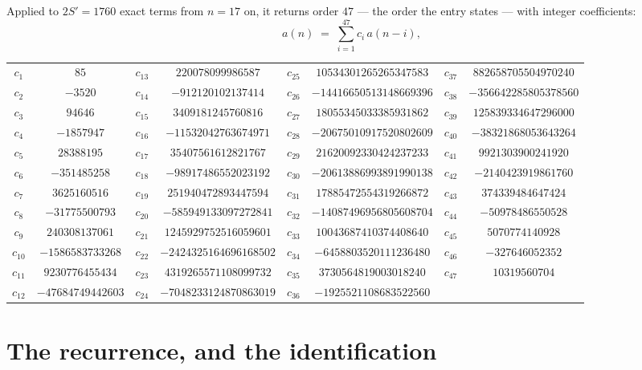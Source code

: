 \documentclass[11pt,a4paper]{article}
\theoremstyle{plain}
\theoremstyle{definition}
\begin{document}
Applied to $2S'=1760$ exact terms from $n=17$ on, it returns order $47$ --- the
order the entry states --- with integer coefficients:
\[
a(n)\;=\;\sum_{i=1}^{47}c_i\,a(n-i),
\]
\begin{center}\small
\begin{tabular}{cccccccc}
$c_{1}$ & $85$ & $c_{13}$ & $220078099986587$ & $c_{25}$ & $10534301265265347583$ & $c_{37}$ & $882658705504970240$ \\
$c_{2}$ & $-3520$ & $c_{14}$ & $-912120102137414$ & $c_{26}$ & $-14416650513148669396$ & $c_{38}$ & $-356642285805378560$ \\
$c_{3}$ & $94646$ & $c_{15}$ & $3409181245760816$ & $c_{27}$ & $18055345033385931862$ & $c_{39}$ & $125839334647296000$ \\
$c_{4}$ & $-1857947$ & $c_{16}$ & $-11532042763674971$ & $c_{28}$ & $-20675010917520802609$ & $c_{40}$ & $-38321868053643264$ \\
$c_{5}$ & $28388195$ & $c_{17}$ & $35407561612821767$ & $c_{29}$ & $21620092330424237233$ & $c_{41}$ & $9921303900241920$ \\
$c_{6}$ & $-351485258$ & $c_{18}$ & $-98917486552023192$ & $c_{30}$ & $-20613886993891990138$ & $c_{42}$ & $-2140423919861760$ \\
$c_{7}$ & $3625160516$ & $c_{19}$ & $251940472893447594$ & $c_{31}$ & $17885472554319266872$ & $c_{43}$ & $374339484647424$ \\
$c_{8}$ & $-31775500793$ & $c_{20}$ & $-585949133097272841$ & $c_{32}$ & $-14087496956805608704$ & $c_{44}$ & $-50978486550528$ \\
$c_{9}$ & $240308137061$ & $c_{21}$ & $1245929752516059601$ & $c_{33}$ & $10043687410374408640$ & $c_{45}$ & $5070774140928$ \\
$c_{10}$ & $-1586583733268$ & $c_{22}$ & $-2424325164696168502$ & $c_{34}$ & $-6458803520111236480$ & $c_{46}$ & $-327646052352$ \\
$c_{11}$ & $9230776455434$ & $c_{23}$ & $4319265571108099732$ & $c_{35}$ & $3730564819003018240$ & $c_{47}$ & $10319560704$ \\
$c_{12}$ & $-47684749442603$ & $c_{24}$ & $-7048233124870863019$ & $c_{36}$ & $-1925521108683522560$ &  &  \\
\end{tabular}
\end{center}

\section{The recurrence, and the identification}
\end{document}
